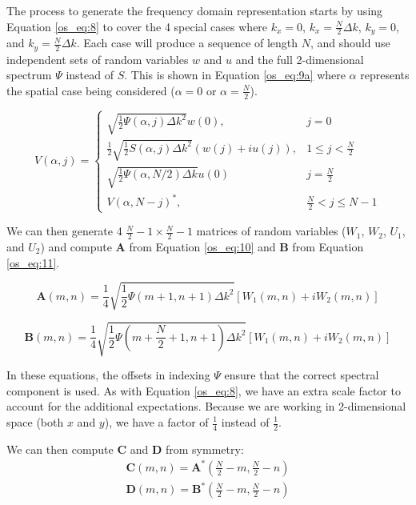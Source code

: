The process to generate the frequency domain representation starts by using Equation \ref{os_eq:8} to cover the 4 special cases where $k_x = 0$, $k_x = \frac{N}{2}\Delta k$, $k_y = 0$, and $k_y = \frac{N}{2}\Delta k$. Each case will produce a sequence of length $N$, and should use independent sets of random variables $w$ and $u$ and the full 2-dimensional spectrum $\Psi$ instead of $S$. This is shown in Equation \ref{os_eq:9a} where $\alpha$ represents the spatial case being considered ($\alpha = 0$ or $\alpha = \frac{N}{2}$).

\begin{equation}
  \label{os_eq:9a}   
  V(\alpha,j) = \begin{cases}
    \sqrt{\frac{1}{2}\Psi(\alpha,j)\Delta k^2}w(0), & j = 0 \\
    \frac{1}{2}\sqrt{\frac{1}{2}S(\alpha,j)\Delta k^2}\left(w(j) + iu(j) \right), & 1 \leq j < \frac{N}{2} \\
   \sqrt{\frac{1}{2}\Psi(\alpha,N/2)\Delta k}u(0) & j = \frac{N}{2} \\
    V(\alpha,N-j)^*, &  \frac{N}{2} < j \leq N-1 
  \end{cases} 
\end{equation}

We can then generate 4 $\frac{N}{2} - 1 \times \frac{N}{2} - 1$ matrices of random variables ($W_1$, $W_2$, $U_1$, and $U_2$) and compute $\mathbf{A}$ from Equation \ref{os_eq:10} and $\mathbf{B}$ from Equation \ref{os_eq:11}.

\begin{equation}
\label{os_eq:10}
\mathbf{A}(m,n) = \frac{1}{4}\sqrt{\frac{1}{2}\Psi(m+1,n+1)\Delta k^2}\left[W_1(m,n) + iW_2(m,n) \right]
\end{equation}

\begin{equation}
\label{os_eq:11}
\mathbf{B}(m,n) = \frac{1}{4}\sqrt{\frac{1}{2}\Psi(m+\frac{N}{2} + 1,n+1)\Delta k^2}\left[W_1(m,n) + iW_2(m,n) \right]
\end{equation}

In these equations, the offsets in indexing $\Psi$ ensure that the correct spectral component is used. As with Equation \ref{os_eq:8}, we have an extra scale factor to account for the additional expectations. Because we are working in 2-dimensional space (both $x$ and $y$), we have a factor of $\frac{1}{4}$ instead of $\frac{1}{2}$.

We can then compute $\mathbf{C}$ and $\mathbf{D}$ from symmetry:
\begin{equation}
\label{os_eq:12}
\begin{gathered}
\mathbf{C}(m,n) = \mathbf{A}^*\left(\frac{N}{2} - m, \frac{N}{2} - n \right) \\
\mathbf{D}(m,n) = \mathbf{B}^*\left(\frac{N}{2} - m, \frac{N}{2} - n \right) \\
\end{gathered}
\end{equation}

